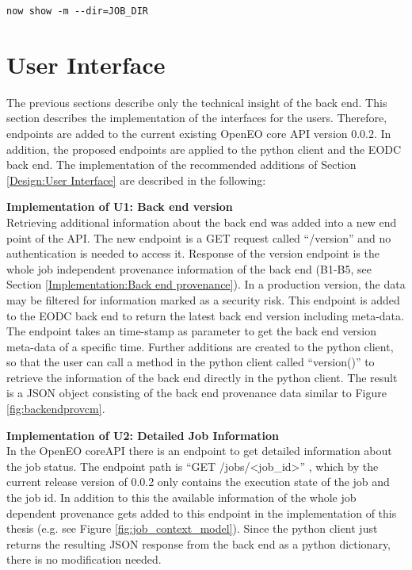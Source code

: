 \documentclass[draft,final]{vutinfth} %
\begin{document}
\begin{lstlisting}[frame=single]
now show -m --dir=JOB_DIR
\end{lstlisting}

\section{User Interface}\label{Implementation:User Interface}
The previous sections describe only the technical insight of the back end. This section describes the implementation of the interfaces for the users. Therefore, endpoints are added to the current existing OpenEO core API version 0.0.2. In addition, the proposed endpoints are applied to the python client and the EODC back end. The implementation of the recommended additions of Section \ref{Design:User Interface} are described in the following:

\textbf{Implementation of U1: Back end version} \\
Retrieving additional information about the back end was added into a new end point of the API. The new endpoint is a GET request called “/version” and no authentication is needed to access it. Response of the version endpoint is the whole job independent provenance information of the back end (B1-B5, see Section \ref{Implementation:Back end provenance}). In a production version, the data may be filtered for information marked as a security risk. This endpoint is added to the EODC back end to return the latest back end version including meta-data. The endpoint takes an time-stamp as parameter to get the back end version meta-data of a specific time. Further additions are created to the python client, so that the user can call a method in the python client called “version()” to retrieve the information of the back end directly in the python client. The result is a JSON object consisting of the back end provenance data similar to Figure \ref{fig:backendprovcm}.

\textbf{Implementation of U2: Detailed Job Information} \\
In the OpenEO coreAPI there is an endpoint to get detailed information about the job status. The endpoint path is “GET /jobs/<job\_id>” , which by the current release version of 0.0.2 only contains the execution state of the job and the job id. In addition to this the available information of the whole job dependent provenance gets added to this endpoint in the implementation of this thesis (e.g. see Figure \ref{fig:job_context_model}). Since the python client just returns the resulting JSON response from the back end as a python dictionary, there is no modification needed.
\end{document}
